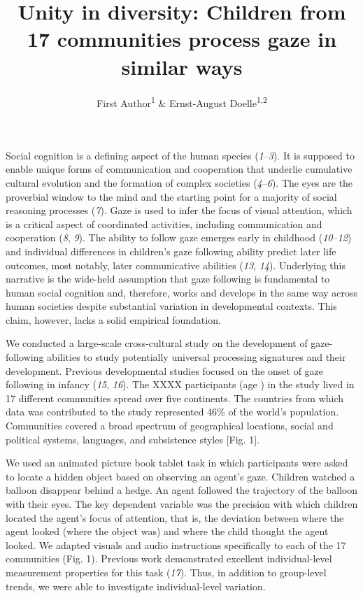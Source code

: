 \documentclass[
  man,floatsintext]{apa6}
\title{Unity in diversity: Children from 17 communities process gaze in similar ways}
\author{First Author\textsuperscript{1} \& Ernst-August Doelle\textsuperscript{1,2}}
\date{}
\affiliation{\vspace{0.5cm}\textsuperscript{1} Wilhelm-Wundt-University\\\textsuperscript{2} Konstanz Business School}
\begin{document}
\maketitle

Social cognition is a defining aspect of the human species (\emph{1}--\emph{3}). It is supposed to enable unique forms of communication and cooperation that underlie cumulative cultural evolution and the formation of complex societies (\emph{4}--\emph{6}). The eyes are the proverbial window to the mind and the starting point for a majority of social reasoning processes (\emph{7}). Gaze is used to infer the focus of visual attention, which is a critical aspect of coordinated activities, including communication and cooperation (\emph{8}, \emph{9}). The ability to follow gaze emerges early in childhood (\emph{10}--\emph{12}) and individual differences in children's gaze following ability predict later life outcomes, most notably, later communicative abilities (\emph{13}, \emph{14}). Underlying this narrative is the wide-held assumption that gaze following is fundamental to human social cognition and, therefore, works and develops in the same way across human societies despite substantial variation in developmental contexts. This claim, however, lacks a solid empirical foundation.

We conducted a large-scale cross-cultural study on the development of gaze-following abilities to study potentially universal processing signatures and their development. Previous developmental studies focused on the onset of gaze following in infancy (\emph{15}, \emph{16}). The XXXX participants (age ) in the study lived in 17 different communities spread over five continents. The countries from which data was contributed to the study represented 46\% of the world's population. Communities covered a broad spectrum of geographical locations, social and political systems, languages, and subsistence styles {[}Fig. 1{]}.

We used an animated picture book tablet task in which participants were asked to locate a hidden object based on observing an agent's gaze. Children watched a balloon disappear behind a hedge. An agent followed the trajectory of the balloon with their eyes. The key dependent variable was the precision with which children located the agent's focus of attention, that is, the deviation between where the agent looked (where the object was) and where the child thought the agent looked. We adapted visuals and audio instructions specifically to each of the 17 communities (Fig. 1). Previous work demonstrated excellent individual-level measurement properties for this task (\emph{17}). Thus, in addition to group-level trends, we were able to investigate individual-level variation.
\end{document}
